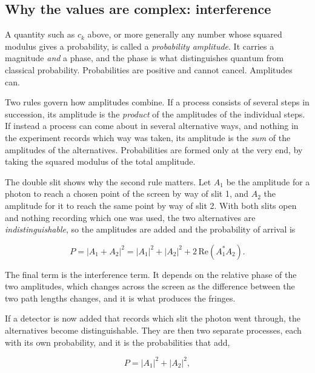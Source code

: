    \subsection{Why the values are complex: interference}

        A quantity such as $c_{k}$ above, or more generally any number whose squared modulus gives a probability, is called a \emph{probability amplitude}. It carries a magnitude \emph{and} a phase, and the phase is what distinguishes quantum from classical probability. Probabilities are positive and cannot cancel. Amplitudes can.

        Two rules govern how amplitudes combine. If a process consists of several steps in succession, its amplitude is the \emph{product} of the amplitudes of the individual steps. If instead a process can come about in several alternative ways, and nothing in the experiment records which way was taken, its amplitude is the \emph{sum} of the amplitudes of the alternatives. Probabilities are formed only at the very end, by taking the squared modulus of the total amplitude.

        The double slit shows why the second rule matters. Let $A_{1}$ be the amplitude for a photon to reach a chosen point of the screen by way of slit 1, and $A_{2}$ the amplitude for it to reach the same point by way of slit 2. With both slits open and nothing recording which one was used, the two alternatives are \emph{indistinguishable}, so the amplitudes are added and the probability of arrival is 

        \begin{equation*}
            P = |A_{1} + A_{2}|^{2} = |A_{1}|^{2} + |A_{2}|^{2} + 2\,\mathrm{Re}\!\left(A_{1}^{*}A_{2}\right).
        \end{equation*}

        The final term is the interference term. It depends on the relative phase of the two amplitudes, which changes across the screen as the difference between the two path lengths changes, and it is what produces the fringes.

        If a detector is now added that records which slit the photon went through, the alternatives become distinguishable. They are then two separate processes, each with its own probability, and it is the probabilities that add,

        \begin{equation*}
            P = |A_{1}|^{2} + |A_{2}|^{2},
        \end{equation*}

